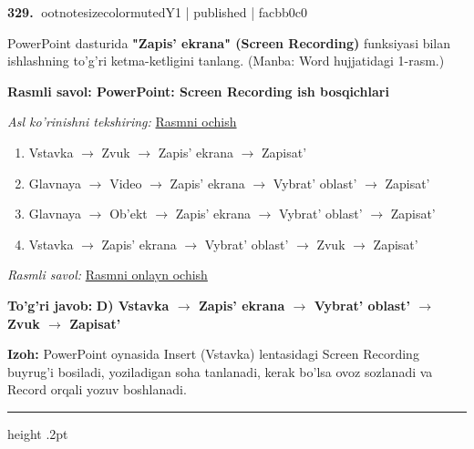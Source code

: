 \documentclass[10pt,a4paper]{article}
\begin{document}
\textbf{\color{ink}329.} {ootnotesizecolor{muted}Y1 | published | facbb0c0}
\par
PowerPoint dasturida \textbf{"Zapis' ekrana" (Screen Recording)} funksiyasi bilan ishlashning to'g'ri ketma-ketligini tanlang. (Manba: Word hujjatidagi 1-rasm.)
\begin{center}\begin{tcolorbox}[colback=gray!4,colframe=teal!55!black,width=.94\linewidth,arc=1mm,boxrule=.4pt]
\textbf{Rasmli savol: PowerPoint: Screen Recording ish bosqichlari}
\par\smallskip\textit{Asl ko'rinishni tekshiring: }\href{https://github.com/sarvar9417/attestatsiya/blob/main/public/kuzgi-demo/demo_q01_powerpoint.svg}{Rasmni ochish}
\end{tcolorbox}\end{center}
\begin{enumerate}[label=\Alph*),leftmargin=9mm]
\item Vstavka \ensuremath{\rightarrow} Zvuk \ensuremath{\rightarrow} Zapis' ekrana \ensuremath{\rightarrow} Zapisat'
\item Glavnaya \ensuremath{\rightarrow} Video \ensuremath{\rightarrow} Zapis' ekrana \ensuremath{\rightarrow} Vybrat' oblast' \ensuremath{\rightarrow} Zapisat'
\item Glavnaya \ensuremath{\rightarrow} Ob'ekt \ensuremath{\rightarrow} Zapis' ekrana \ensuremath{\rightarrow} Vybrat' oblast' \ensuremath{\rightarrow} Zapisat'
\item Vstavka \ensuremath{\rightarrow} Zapis' ekrana \ensuremath{\rightarrow} Vybrat' oblast' \ensuremath{\rightarrow} Zvuk \ensuremath{\rightarrow} Zapisat'
\end{enumerate}
\par\smallskip\textit{Rasmli savol: }\href{https://github.com/sarvar9417/attestatsiya/blob/main/public/kuzgi-demo/demo_q01_powerpoint.svg}{Rasmni onlayn ochish}
\begin{tcolorbox}[enhanced,breakable,colback=teal!4,colframe=teal!55!black,boxrule=0.45pt,arc=1.2mm,left=2.8mm,right=2.8mm,top=2mm,bottom=2mm]
\textbf{\color{teal}To'g'ri javob:} \textbf{D) Vstavka \ensuremath{\rightarrow} Zapis' ekrana \ensuremath{\rightarrow} Vybrat' oblast' \ensuremath{\rightarrow} Zvuk \ensuremath{\rightarrow} Zapisat'}
\par\smallskip
\textbf{Izoh:} PowerPoint oynasida Insert (Vstavka) lentasidagi Screen Recording buyrug'i bosiladi, yoziladigan soha tanlanadi, kerak bo'lsa ovoz sozlanadi va Record orqali yozuv boshlanadi.
\end{tcolorbox}
\vspace{2mm}\hrule height .2pt\vspace{2mm}
\end{document}
